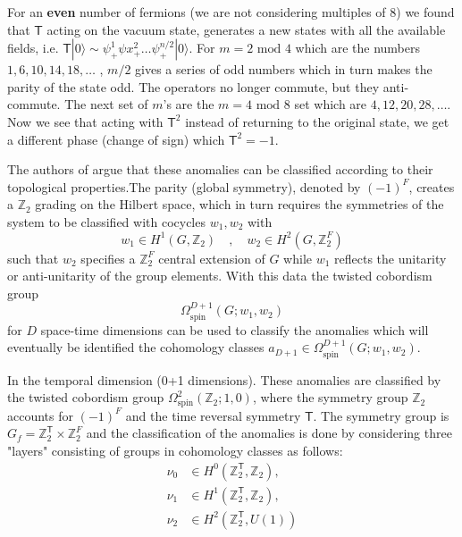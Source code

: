 \documentclass[12pt,a4paper]{article}
\begin{document}
For an \textbf{even} number of fermions (we are not considering multiples of 8)  we
found that $ \mathsf{T} $ acting on the vacuum state, generates a new states
with all the available fields, i.e. $ \mathsf{T} | 0 \rangle \sim \psi _+^1
\psi x_+ ^2 \dots \psi ^{n/2} _+ | 0 \rangle  $. For $ m = 2 \text{ mod } 4 $
which are the numbers $ 1,6,10,14,18,\dots $ , $ m/2 $ gives a series of odd
numbers which in turn makes the parity of the state odd.  The operators no
longer commute, but they anti-commute. The next set of $ m $'s are the $ m = 4
\text{ mod } 8 $ set which are $ 4,12,20,28,\dots $. Now we see that acting
with $ \mathsf{T}^2 $ instead of returning to the original state, we get a
different phase (change of sign) which $ \mathsf{T}^2 = -1 $. 

The authors of \cite{Delmastro2021} argue that these anomalies can be
classified according to their topological properties.The parity (global
symmetry), denoted by $ (-1)^F $, creates a $ \mathbb{Z}_2  $ grading on the
Hilbert space, which in turn requires the symmetries of the system to be
classified with cocycles $ w_1,w_2 $ with \begin{equation*} w_1 \in
H^1(G,\mathbb{Z}_2)\quad , \quad w_2 \in H^2(G, \mathbb{Z}_2^F) \end{equation*}
such that $ w_2 $ specifies a $ \mathbb{Z}_2^F  $ central extension of $ G $
while $ w_1 $  reflects the unitarity or anti-unitarity of the group elements.
With this data the twisted cobordism group
\begin{equation*}
	\Omega _{ \text{spin}  } ^{ D+1 } (G;w_{1},w_{2})
\end{equation*}
for  $ D $ space-time dimensions can be used to classify the anomalies which
will eventually be identified the cohomology classes $ a _{ D+1 } \in \Omega _{
	\text{spin}  } ^{ D+1 } (G;w_{1},w_{2}) $.

In the temporal dimension (0+1 dimensions). These anomalies are classified by the twisted cobordism group $\Omega^2 _{ \text{spin}}( \mathbb{Z}_2;1,0) $, where the symmetry group $
\mathbb{Z}_2  $ accounts for $ (-1)^F $ and the time reversal symmetry $
\mathsf{T} $. The symmetry group is $ G_f = \mathbb{Z}_2 ^{ \mathsf{T} } \times
\mathbb{Z}_2 ^{F}$ and the classification of the anomalies is done by considering three "layers" consisting of groups in cohomology classes as follows:
\begin{align*}
	\nu _0 &\in H^0( \mathbb{Z}_2 ^{ \mathsf{T} } , \mathbb{Z}_2),\\
	\nu _1 &\in H^1( \mathbb{Z}_2 ^{ \mathsf{T} } , \mathbb{Z}_2),\\
	\nu _2 &\in H^2( \mathbb{Z}_2 ^{ \mathsf{T} } ,U(1)) 
\end{align*}

\printbibliography
\end{document}
